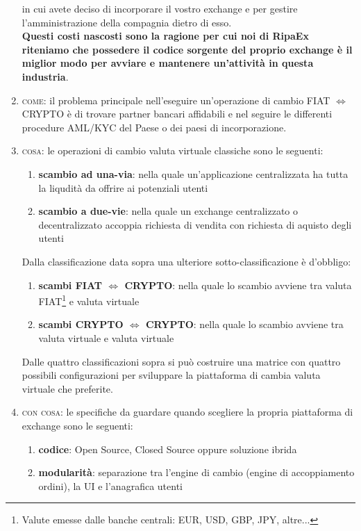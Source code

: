 \documentclass[11pt,fleqn,oneside]{book} %
\begin{document}
\begin{enumerate}
	in cui avete deciso di incorporare il vostro exchange e per gestire l'amministrazione della compagnia dietro di esso.\\
	\textbf{Questi costi nascosti sono la ragione per cui noi di RipaEx riteniamo che possedere il codice sorgente del proprio exchange è il miglior
	modo per avviare e mantenere un'attività in questa industria}.
	\item \textsc{come}: il problema principale nell'eseguire un'operazione di cambio FIAT $\Leftrightarrow$ CRYPTO è di trovare partner bancari affidabili
	e nel seguire le differenti procedure AML/KYC del Paese o dei paesi di incorporazione.
	\item \textsc{cosa}: le operazioni di cambio valuta virtuale classiche sono le seguenti:
		\begin{enumerate}[label*=\arabic*.]
			\item \textbf{scambio ad una-via}: nella quale un'applicazione centralizzata ha tutta la liqudità da offrire ai potenziali utenti
			\item \textbf{scambio a due-vie}: nella quale un exchange centralizzato o decentralizzato accoppia richiesta di vendita con richiesta di aquisto degli utenti
		\end{enumerate}
		Dalla classificazione data sopra una ulteriore sotto-classificazione è d'obbligo:
		\begin{enumerate}[label*=\arabic*.]
			\item \textbf{scambi FIAT $\Leftrightarrow$ CRYPTO}: nella quale lo scambio avviene tra valuta FIAT\footnote{Valute emesse dalle banche centrali: EUR, USD, GBP, JPY, altre...}
			e valuta virtuale
			\item \textbf{scambi CRYPTO $\Leftrightarrow$ CRYPTO}: nella quale lo scambio avviene tra valuta virtuale e valuta virtuale
		\end{enumerate}
	Dalle quattro classificazioni sopra si può costruire una matrice con quattro possibili configurazioni per sviluppare la piattaforma di cambia valuta virtuale
	che preferite.
	\item \textsc{con cosa}: le specifiche da guardare quando scegliere la propria piattaforma di exchange sono le seguenti: 
		\begin{enumerate}[label*=\arabic*.]
			\item \textbf{codice}: Open Source, Closed Source oppure soluzione ibrida
			\item \textbf{modularità}: separazione tra l'engine di cambio (engine di accoppiamento ordini), la UI e l'anagrafica utenti

\end{enumerate}
\end{enumerate}
\end{document}

